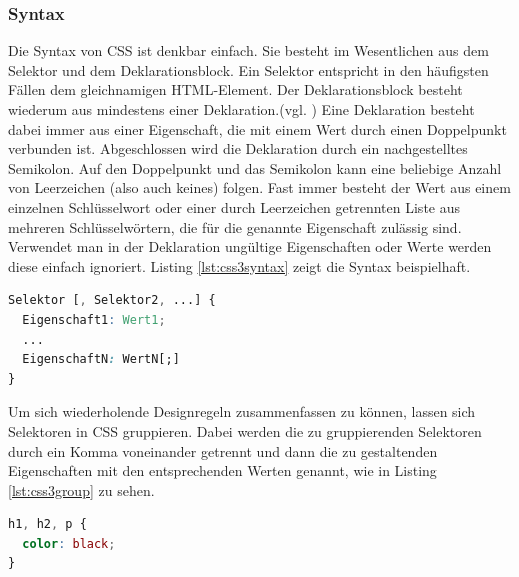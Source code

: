 \subsubsection{Syntax} Die Syntax von CSS ist denkbar einfach. Sie besteht im Wesentlichen aus dem Selektor und dem Deklarationsblock. Ein Selektor entspricht in den häufigsten Fällen dem gleichnamigen HTML-Element. Der Deklarationsblock besteht wiederum aus mindestens einer Deklaration.(vgl. \cite[S.26]{MeyeCasc2005}) \glqq Eine Deklaration besteht dabei immer aus einer Eigenschaft, die mit einem Wert durch einen Doppelpunkt verbunden ist. Abgeschlossen wird die Deklaration durch ein nachgestelltes Semikolon. Auf den Doppelpunkt und das Semikolon kann eine beliebige Anzahl von Leerzeichen (also auch keines) folgen. Fast immer besteht der Wert aus einem einzelnen Schlüsselwort oder einer durch Leerzeichen getrennten Liste aus mehreren Schlüsselwörtern, die für die genannte Eigenschaft zulässig sind.\grqq{}\cite[S.28]{MeyeCasc2005} Verwendet man in der Deklaration ungültige Eigenschaften oder Werte werden diese einfach ignoriert. Listing \ref{lst:css3syntax} zeigt die Syntax beispielhaft.

\vspace{1em}
\begin{lstlisting}[language=CSS, caption=CSS3 Syntax Beispiel, label=lst:css3syntax]
Selektor [, Selektor2, ...] {
  Eigenschaft1: Wert1;
  ...
  EigenschaftN: WertN[;]
}
\end{lstlisting}

Um sich wiederholende Designregeln zusammenfassen zu können, lassen sich Selektoren in CSS gruppieren. Dabei werden die zu gruppierenden Selektoren durch ein Komma voneinander getrennt und dann die zu gestaltenden Eigenschaften mit den entsprechenden Werten genannt, wie in Listing \ref{lst:css3group} zu sehen.

\vspace{1em}
\begin{lstlisting}[language=CSS, caption=CSS3 Gruppierung, label=lst:css3group]
h1, h2, p {
  color: black;
}
\end{lstlisting}

